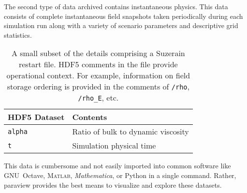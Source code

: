 The second type of data archived contains instantaneous physics.  This data
consists of complete instantaneous field snapshots taken periodically during each
simulation run along with a variety of scenario parameters and descriptive grid
statistics.  

\begin{table}
\centering
\caption[Instantaneous fields and other details comprising a restart file]{%
  A small subset of the details comprising a Suzerain restart file.
  HDF5 comments in the file provide operational context.  For example,
  information on field storage ordering is provided in the comments of
  \texttt{/rho}, \texttt{/rho\_E}, etc.\label{tbl:restartfile}
}
\begin{small}
\begin{tabular}{p{}|p{}}
HDF5 Dataset & Contents \\ \hline \hline
\texttt{alpha                 } & Ratio of bulk to dynamic viscosity \\
\texttt{t                     } & Simulation physical time 
\end{tabular}
\end{small}
\end{table}

This data is cumbersome and not easily imported into common software like GNU~Octave,
\textsc{Matlab}\textsuperscript{\textregistered}, \textit{Mathematica}\textsuperscript{\textregistered}, or
Python in a single command. Rather, paraview provides the best means to visualize and explore these 
datasets. 
